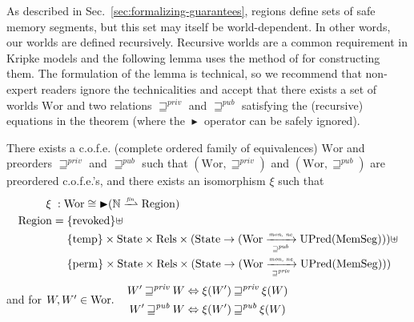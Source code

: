 \documentclass{llncs}
\newcommand{\sectionname}{Sec.}
\newcommand{\finparfun}{\xrightharpoonup{\textit{\tiny{fin}}}}
\newcommand{\fun}{\rightarrow}
\newcommand{\blater}{\mathop{\blacktriangleright}}
\newcommand{\cofe}{c.o.f.e.}
\newcommand{\cofes}{\cofe{}'s}
\newcommand\lau[1]{{\color{purple} \sf \footnotesize {LS: #1}}\\}
\newcommand\dominique[1]{{\color{purple} \sf \footnotesize {DD: #1}}\\}
\renewcommand\lau[1]{}
\renewcommand\dominique[1]{}
\newcommand{\var}[1]{\mathit{#1}}
\newcommand{\futurewk}{\mathbin{\sqsupseteq}^{\var{pub}}}
\newcommand{\futurestr}{\mathbin{\sqsupseteq}^{\var{priv}}}
\newcommand{\monwknefun}{\xrightarrow[\text{\tiny{$\futurewk$}}]{\textit{\tiny{mon, ne}}}}
\newcommand{\monstrnefun}{\xrightarrow[\text{\tiny{$\futurestr$}}]{\textit{\tiny{mon, ne}}}}
\newcommand{\plaindom}[1]{\mathrm{#1}}
\newcommand{\HeapSegments}{\plaindom{MemSeg}}
\newcommand{\nats}{\mathbb{N}}
\newcommand{\Rels}{\plaindom{Rels}}
\newcommand{\States}{\plaindom{State}}
\newcommand{\Regions}{\plaindom{Region}}
\newcommand{\Wor}{\plaindom{Wor}}
\newcommand{\UPred}[1]{\plaindom{UPred}(#1)}
\newcommand{\plainview}[1]{\mathrm{#1}}
\newcommand{\perma}{\plainview{perm}}
\newcommand{\temp}{\plainview{temp}}
\newcommand{\revoked}{\plainview{revoked}}
\begin{document}
As described in \sectionname~\ref{sec:formalizing-guarantees}, regions define sets of
safe memory segments, but this set may itself be world-dependent. In other
words, our worlds are defined recursively. Recursive worlds are a common
requirement in Kripke models and the following lemma uses the method of
\cite{Birkedal:2011:SKM:1926385.1926401,Birkedal:tutorial-notes} for
constructing them. The formulation of the lemma is technical, so we recommend
that non-expert readers ignore the technicalities and accept that there exists a
set of worlds $\Wor$ and two relations $\futurestr$ and $\futurewk$ satisfying
the (recursive) equations in the theorem (where the $\blater$ operator can be
safely ignored).
\begin{theorem}\label{thm:world-existence}
  There exists a \cofe{} (complete ordered family of equivalences) $\Wor$ and preorders $\futurestr$ and
  $\futurewk$ such that $(\Wor,\futurestr)$ and $(\Wor,\futurewk)$ are
  preordered \cofes{}, and there exists an isomorphism $\xi$ such that
  \begin{align*}
      \xi \; : \; & \Wor \cong \blater (\nats \finparfun \Regions)\\
      \Regions  = & \; \{\revoked\} \uplus \\
               & \; \{\temp\} \times \States \times \Rels \times (\States \fun (\Wor \monwknefun \UPred{\HeapSegments}))\uplus \\
               & \; \{\perma\} \times \States \times \Rels \times (\States \fun (\Wor \monstrnefun \UPred{\HeapSegments}))
    \end{align*}
  and for $W, W' \in \Wor\ldotp \quad  
  \begin{aligned}
    W' \futurestr W & \Leftrightarrow \xi(W') \futurestr \xi(W)   \\
    W' \futurewk W & \Leftrightarrow \xi(W') \futurewk \xi(W)
  \end{aligned}$
\end{theorem}
\end{document}
